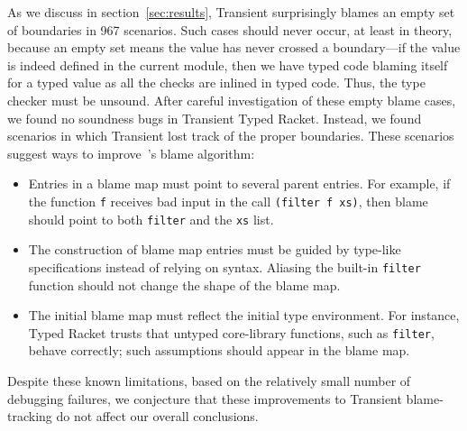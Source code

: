 As we discuss in section~\ref{sec:results}, Transient surprisingly blames
an empty set of boundaries in 967 scenarios.
Such cases should never occur, at least in theory, because an empty set
 means the value has never crossed a boundary---if the value is indeed defined
 in the current module, then we have typed code blaming itself for a typed
 value as all the checks are inlined in typed code. Thus, the type checker must be unsound.
After careful investigation of these empty blame cases, we found no soundness
 bugs in Transient Typed Racket.
Instead, we found scenarios in which Transient lost track of the proper
 boundaries.
These scenarios suggest ways to improve~\citet{vss-popl-2017}'s blame
algorithm:
\begin{itemize}
  \item
    Entries in a blame map must point to several parent entries.
    For example, if the function \texttt{f} receives bad input in the call
    \texttt{(filter f xs)}, then blame should point to both \texttt{filter}
    and the \texttt{xs} list.
  \item
    The construction of blame map entries must be guided by type-like specifications
     instead of relying on syntax.
    Aliasing the built-in \texttt{filter} function should not change the shape
     of the blame map.
  \item
    The initial blame map must reflect the initial type environment.
    For instance, Typed Racket trusts that untyped core-library functions, such as \texttt{filter},
     behave correctly; such assumptions should appear in the blame map.
\end{itemize}
\noindent{}Despite these known limitations, based on the relatively small
number of debugging failures, we conjecture that these improvements
 to Transient blame-tracking do not affect our overall conclusions.

